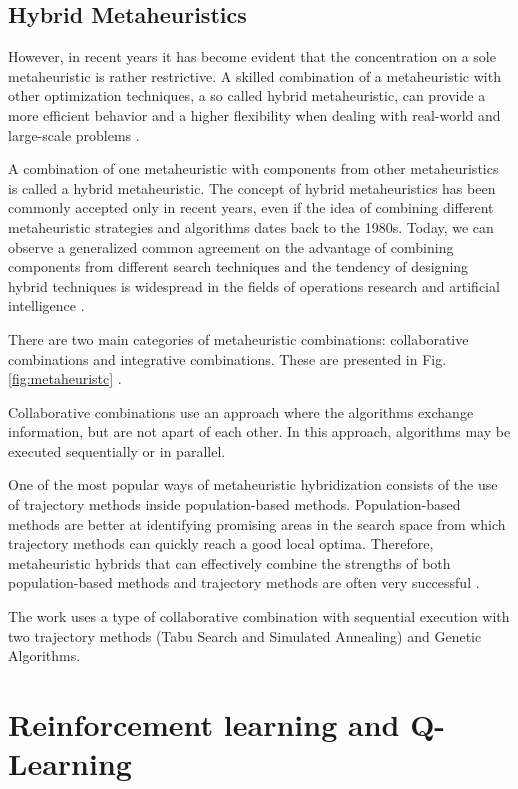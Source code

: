\documentclass{bmcart}
\begin{document}
\subsection{Hybrid  Metaheuristics}

However, in recent years it has become evident that the concentration on a sole metaheuristic is rather restrictive. A skilled combination of a metaheuristic with other optimization techniques, a so called hybrid metaheuristic, can provide a more efficient behavior
and a higher flexibility when dealing with real-world and large-scale problems \citep{Talbi2012}.

A combination of one metaheuristic with components from other metaheuristics is called a hybrid metaheuristic. The concept of hybrid metaheuristics has been commonly accepted only in recent years, even if the idea of combining different metaheuristic strategies and algorithms dates back to the 1980s. Today, we can observe a generalized common agreement on the advantage of combining components from different search techniques and the tendency of designing hybrid techniques is widespread in the fields of operations research and artificial intelligence \citep{raidl2010metaheuristic}. 

There are two main categories of metaheuristic combinations: collaborative combinations and integrative combinations. These are presented in Fig. \ref{fig:metaheuristc} \citep{Raidl2006}.



Collaborative combinations use an approach where the algorithms exchange information, but are not apart of each other. In this approach, algorithms may be executed sequentially or in parallel. 

One of the most popular ways of metaheuristic hybridization consists of the use of trajectory methods inside population-based methods. Population-based methods are better at identifying promising areas in the search space from which trajectory methods can quickly reach a good local optima. Therefore, metaheuristic hybrids that can effectively combine the strengths of both population-based methods and trajectory methods are often very successful \citep{raidl2010metaheuristic}.


The work uses a type of collaborative combination with sequential execution with two trajectory methods (Tabu Search and Simulated Annealing) and Genetic Algorithms.

\section{Reinforcement learning and Q-Learning}
\end{document}
